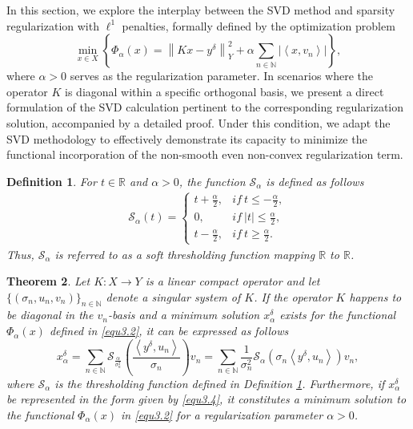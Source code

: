\documentclass[a4paper,12pt]{article}
\newtheorem{theorem}{Theorem}[section]
\newtheorem{definition}[theorem]{Definition}
\numberwithin{equation}{section}
\begin{document}
\par In this section, we explore the interplay between the SVD method and sparsity regularization with $\ell^{1}$ penalties, formally defined by the optimization problem
\begin{equation}\label{equ3.2}
    \min_{x\in X}\left\{\Phi_{\alpha}(x)=\left\|Kx-y^{\delta}\right\|_{Y}^{2}+ \alpha\sum_{n\in\mathbb{N}}\left|\left<x,v_{n}\right>\right|\right\},
\end{equation}
where $\alpha>0$ serves as the regularization parameter. In scenarios where the operator $K$ is diagonal within a specific orthogonal basis, we present a direct formulation of the SVD calculation pertinent to the corresponding regularization solution, accompanied by a detailed proof. Under this condition, we adapt the SVD methodology to effectively demonstrate its capacity to minimize the functional incorporation of the non-smooth even non-convex regularization term.

\begin{definition}\label{def3.2}
    For $t\in\mathbb{R}$ and $\alpha>0$, the function $\mathcal{S}_{\alpha}$ is defined as follows
\begin{align}\label{equ3.3}
    \mathcal{S}_{\alpha}(t)=
    \left\{             
             \begin{array}{ll}
             t+\frac{\alpha}{2}, & if \ t\leq -\frac{\alpha}{2}, \\
             0, & if \ |t|\leq \frac{\alpha}{2}, \\
             t-\frac{\alpha}{2}, & if \ t\geq \frac{\alpha}{2}. 
             \end{array}
    \right.
\end{align}
Thus, $\mathcal{S}_{\alpha}$ is referred to as a soft thresholding function mapping $\mathbb{R}$ to $\mathbb{R}$.
\end{definition}

\begin{theorem}\label{the3.3}
    Let $K: X\rightarrow Y$ is a linear compact operator and let $\{(\sigma_{n},u_{n},v_{n})\}_{n\in\mathbb{N}}$ denote a singular system of $K$. If the operator $K$ happens to be diagonal in the $v_{n}$-basis and a minimum solution $x_{\alpha}^{\delta}$ exists for the functional $\Phi_{\alpha}\left(x\right)$ defined in \eqref{equ3.2}, it can be expressed as follows
    \begin{equation}\label{equ3.4}
        x_{\alpha}^{\delta}=\sum_{n\in\mathbb{N}}\mathcal{S}_{\frac{\alpha}{\sigma_{n}^{2}}}\left(\frac{\left< y^{\delta},u_{n}\right>}{\sigma_{n}}\right)v_{n}
        =\sum_{n\in\mathbb{N}}\frac{1}{\sigma_{n}^{2}}\mathcal{S}_{\alpha}(\sigma_{n}\left< y^{\delta},u_{n}\right>)v_{n},
    \end{equation}
    where $\mathcal{S}_{\alpha}$ is the thresholding function defined in Definition \ref{def3.2}. Furthermore, if $x_{\alpha}^{\delta}$ be represented in the form given by \eqref{equ3.4}, it constitutes a minimum solution to the functional  $\Phi_{\alpha}\left(x\right)$ in \eqref{equ3.2} for a regularization parameter $\alpha >0$.    
\end{theorem}
\end{document}
